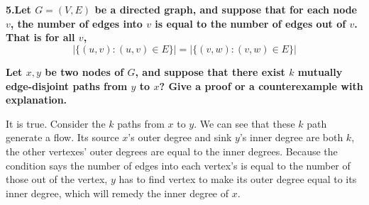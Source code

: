 
\chapter{}
\textbf{
5.Let $G=(V,E)$ be a directed graph, and suppose that for each node $v$, the number of edges into $v$ is equal to the number of edges out of $v$. That is for all $v$,
$$|\{(u,v):(u,v)\in E\}|=|\{(v,w):(v,w)\in E\}|$$
}

\textbf{
Let $x,y$ be two nodes of $G$, and suppose that there exist $k$ mutually edge-disjoint paths from $y$ to $x$? Give a proof or a counterexample with explanation.
}

It is true.
Consider the $k$ paths from $x$ to $y$. We can see that these $k$ path generate a flow. Its source $x$'s outer degree and sink $y$'s inner degree are both $k$, the other vertexes' outer degrees are equal to the inner degrees. Because the condition says the number of edges into each vertex's is equal to the number of those out of the vertex, $y$ has to find vertex to make its outer degree equal to its inner degree, which will remedy the inner degree of $x$.
